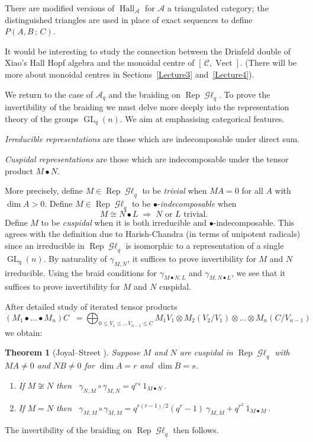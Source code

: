 \documentclass[a4paper,12pt]{article}
\newcommand{\missing}[1]{\marginpar{\color{red}missing:\\#1}}
\newtheorem*{Theorem}{Theorem}%
\theoremstyle{definition}
\theoremstyle{fact}
\theoremstyle{genquest}
\theoremstyle{step}
\newcommand{\catA}{\mathcal{A}}
\newcommand{\catC}{\mathcal{C}}
\newcommand{\GL}{\operatorname{GL}}
\newcommand{\catGL}{\mathop{\mathcal{G}\ell}\nolimits}
\newcommand{\Hall}{\operatorname{Hall}}
\newcommand{\Rep}{\operatorname{Rep}}
\newcommand{\Vect}{\operatorname{Vect}}
\begin{document}
There are modified versions of $\Hall_\catA$ for $\catA$ a triangulated category; 
the distinguished triangles are used in place of exact sequences to define $P(A,B\,;\,C)$.

It would be interesting to study the connection between the Drinfeld double of Xiao's Hall Hopf algebra and the monoidal centre of $[\,\catC,\Vect ]$.  
(There will be more about monoidal centres in Sections~\ref{Lecture3} and~\ref{Lecture4}).  

\bigskip
We return to the case of $\catA_q$ and the braiding  on $\Rep \catGL_q$.  
To prove the invertibility of the braiding we must delve more deeply into the representation theory of the groups $\GL_q (n)$.   
We aim at emphasising categorical  features.     

\medskip\noindent
\emph{Irreducible representations} are those which are indecomposable under direct sum.

\medskip\noindent
\emph{Cuspidal representations} are those which are indecomposable under the tensor product $M \bullet N$. 

\medskip\noindent
More precisely, define $M\in\Rep\catGL_q$ to be \emph{trivial} when $MA=0$ for all $A$ with $\dim A > 0$.   
Define $M\in \Rep \catGL_q$ to be  $\bullet$-\emph{indecomposable} when 
\[
M \cong N \bullet L \;  \Rightarrow \;  N  \text{ or }  L \text{ trivial}.
\]
Define $M$ to be \emph{cuspidal} when it is both irreducible and $\bullet$-indecomposable.  
This agrees with the definition due to  Harish-Chandra (in terms of unipotent radicals) since an irreducible in $\Rep \catGL_q$  is isomorphic to a representation of a single $\GL_q(n)$.   
By naturality of $\gamma^{}_{M,N}$, it suffices to prove invertibility for $M$ and $N$ irreducible.    
Using the braid conditions for $\gamma^{}_{M \bullet N,L}$ and $\gamma^{}_{M,N\bullet L}$, we see that it suffices to prove invertibility for $M$ and $N$ cuspidal.


\medskip\noindent
After detailed study of iterated tensor products
\[
(M_1\bullet \ldots \bullet M_n) C \;\; = \bigoplus_{0\leq V_1 \leq \ldots V_{n-1} \leq C} M_1V_1 \otimes M_2 (V_2/V_1) \otimes \ldots \otimes M_n (C/V_{n-1})
\]
we obtain:
%
\begin{Theorem} [Joyal--Street \cite{GLFq}] %
Suppose $M$ and $N$ are cuspidal in $\Rep \catGL_q$ with $MA\neq 0$ and $NB \neq 0$ for $\dim A = r$ and $\dim B = s$.    

\goodbreak
\begin{enumerate}[\upshape(i)]
\item
 If $M \not\cong N$ then \ 
$ \gamma^{}_{N,M} \circ \gamma^{}_{M,N} = q^{rs} \ 1_{M\bullet N}\,$.
%
\item
  If $M = N$ then \ 
$\gamma^{}_{M,M} \circ \gamma^{}_{M,M} = q^{r(r-1)/2}  (q^r-1) \ \gamma^{}_{M,M} + q^{r^2}\ 1_{M\bullet M}\,$.
\end{enumerate}
\end{Theorem}
%
\noindent
The invertibility of the braiding on $\Rep \catGL_q$ then follows.
\end{document}
